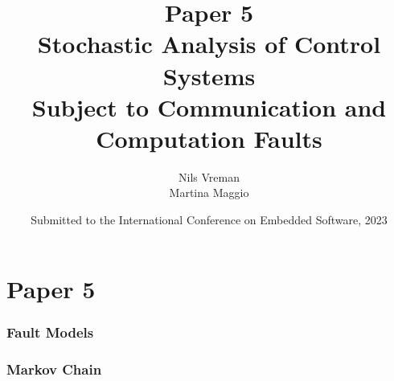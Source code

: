 \section{Paper 5}

\title[PhD Defence]{
    {\Huge Paper 5} \\
    \vspace{2mm}
    {\Large Stochastic Analysis of Control Systems}\\
    {\Large Subject to Communication and Computation Faults}
}
\author[Nils Vreman]{
    Nils Vreman \\
    \vspace{3mm}
    {\large Martina Maggio}
}
\date[EMSOFT 2023]{
    Submitted to the International Conference on Embedded Software, 2023\\
}
\notitlelogo
{}


\begin{frame}
    \frametitle{Fault Models}
    \begin{figure}
        \centering
        \only<2>{}%
        \only<3>{}%
    \end{figure}
\end{frame}

\begin{frame}
    \frametitle{Markov Chain}%
    \begin{figure}
        \centering
        \only<2>{}%
        \only<3>{}%
    \end{figure}
\end{frame}
